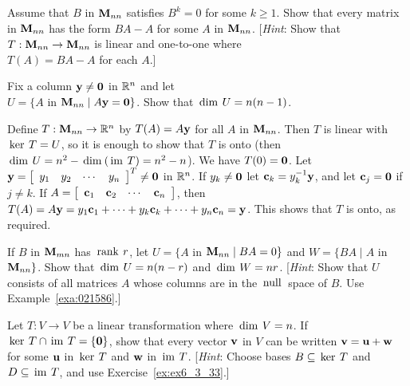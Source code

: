 \begin{multicols}{2}
\begin{ex}
Assume that $B$ in $\textbf{M}_{nn}$ satisfies $B^{k} = 0$ for some $k \geq 1$. Show that every matrix in $\textbf{M}_{nn}$ has the form $BA - A$ for some $A$ in $\textbf{M}_{nn}$. [\textit{Hint}: Show that $T : \textbf{M}_{nn} \to \textbf{M}_{nn}$ is linear and one-to-one where \\ $T(A) = BA - A$ for each $A$.]
\end{ex}

\begin{ex}
Fix a column $\textbf{y} \neq \textbf{0}$ in $\mathbb{R}^n$ and let \\ $U = \{A$ in $\textbf{M}_{nn} \mid A\textbf{y} = \textbf{0}\}$. Show that $\thinspace\operatorname{dim \medspace}U = n(n - 1)$.

\begin{sol}
Define $T : \textbf{M}_{nn} \to \mathbb{R}^n$ by $T(A) = A\textbf{y}$ for all $A$ in $\textbf{M}_{nn}$. Then $T$ is linear with $\thinspace\operatorname{ker \medspace}T = U$, so it is enough to show that $T$ is onto (then $\thinspace\operatorname{dim \medspace}U = n^{2} - \thinspace\operatorname{dim\medspace}(\thinspace\operatorname{im \medspace}T) = n^{2} - n$). We have $T(0) = \textbf{0}$. Let $\textbf{y} = \left[ \begin{array}{cccc}
y_{1} & y_{2} & \cdots & y_{n}
\end{array} \right]^{T} \neq \textbf{0}$ in $\mathbb{R}^n$. If $y_{k} \neq \textbf{0}$ let $\textbf{c}_{k} = y_{k}^{-1}\textbf{y}$, and let $\textbf{c}_{j} = \textbf{0}$ if $j \neq k$. If $A = \left[ \begin{array}{cccc}
\textbf{c}_{1} & \textbf{c}_{2} & \cdots & \textbf{c}_{n}
\end{array} \right]$, then $T(A) = A\textbf{y} = y_{1}\textbf{c}_{1} + \cdots + y_{k}\textbf{c}_{k} + \cdots + y_{n}\textbf{c}_{n} = \textbf{y}$. This shows that $T$ is onto, as required.
\end{sol}
\end{ex}

\begin{ex}
If $B$ in $\textbf{M}_{mn}$ has $\thinspace\operatorname{rank \medspace}r$, let $U = \{A$ in $\textbf{M}_{nn} \mid BA = 0\}$ and $W = \{BA \mid A$ in $\textbf{M}_{nn}\}$. Show that $\thinspace\operatorname{dim \medspace}U = n(n - r)$ and $\thinspace\operatorname{dim \medspace}W = nr$. [\textit{Hint}: Show that $U$ consists of all matrices $A$ whose columns are in the $\thinspace\operatorname{null\medspace}$ space of $B$. Use Example~\ref{exa:021586}.]
\end{ex}

\begin{ex}
Let $T : V \to V$ be a linear transformation where $\thinspace\operatorname{dim \medspace}V = n$. If $\thinspace\operatorname{ker \medspace}T \cap \thinspace\operatorname{im \medspace}T = \{\textbf{0}\}$, show that every vector $\textbf{v}$ in $V$ can be written $\textbf{v} = \textbf{u} + \textbf{w}$ for some $\textbf{u}$ in $\thinspace\operatorname{ker \medspace}T$ and $\textbf{w}$ in $\thinspace\operatorname{im \medspace}T$. [\textit{Hint}: Choose bases $B \subseteq \thinspace\operatorname{ker \medspace}T$ and $D \subseteq \thinspace\operatorname{im \medspace}T$, and use Exercise~\ref{ex:ex6_3_33}.]
\end{ex}


\end{multicols}
